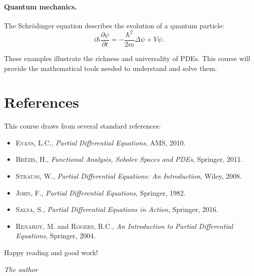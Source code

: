 \paragraph{Quantum mechanics.}
The Schr\"odinger equation describes the evolution of a quantum particle:
\[
    i\hbar \frac{\partial \psi}{\partial t} = -\frac{\hbar^2}{2m}\Delta \psi + V\psi.
\]

These examples illustrate the richness and universality of PDEs. This course
will provide the mathematical tools needed to understand and solve them.

\section*{References}

This course draws from several standard references:
\begin{itemize}
    \item \textsc{Evans}, L.C., \emph{Partial Differential Equations}, AMS, 2010.
    \item \textsc{Br\'ezis}, H., \emph{Functional Analysis, Sobolev Spaces and
          PDEs}, Springer, 2011.
    \item \textsc{Strauss}, W., \emph{Partial Differential Equations: An
          Introduction}, Wiley, 2008.
    \item \textsc{John}, F., \emph{Partial Differential Equations}, Springer, 1982.
    \item \textsc{Salsa}, S., \emph{Partial Differential Equations in Action},
          Springer, 2016.
    \item \textsc{Renardy}, M. and \textsc{Rogers}, R.C., \emph{An Introduction
          to Partial Differential Equations}, Springer, 2004.
\end{itemize}

\vspace{1cm}
\noindent
Happy reading and good work!

\vspace{0.5cm}
\hfill\emph{The author}
